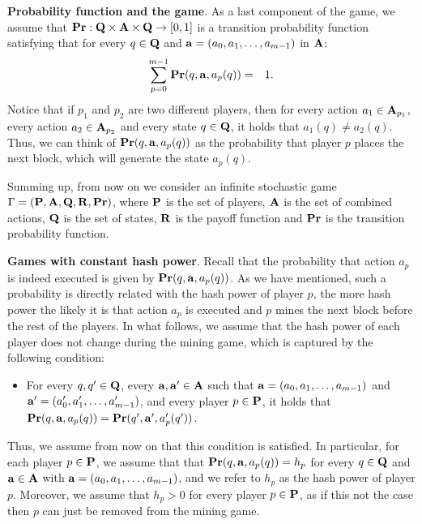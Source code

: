 \medskip
\noindent
\textbf{Probability function and the game}.
As a last component of the game, we assume that $\mathbf{Pr} : \mathbf{Q} \times \mathbf{A} \times \mathbf{Q} \to [0,1]$ is a transition probability function satisfying that for every $q \in \mathbf{Q}$ and $\mathbf{a} = (a_0, a_1, \ldots, a_{m-1})$ in $\mathbf{A}$:
\begin{eqnarray*}\label{eq-prop}
\sum_{p=0}^{m-1} \mathbf{Pr}(q, \mathbf{a}, a_p(q)) & = & 1.
\end{eqnarray*}
Notice that if $p_1$ and $p_2$ are two different players, then for every action $a_1 \in \mathbf{A}_{p_1}$, every action $a_2 \in \mathbf{A}_{p_2}$ and every state $q \in \mathbf{Q}$, it holds that $a_1(q) \neq a_2(q)$. Thus, we can think of $\mathbf{Pr}(q, \mathbf{a}, a_p(q))$ as the probability that player $p$ places the next block, which will generate the state $a_p(q)$. 

Summing up, from now on we consider an infinite stochastic game $\Gamma = (\mathbf{P},\mathbf{A},\mathbf{Q},\mathbf{R},\mathbf{Pr})$, where $\mathbf{P}$ is the set of players, $\mathbf{A}$ is the set of combined actions, $\mathbf{Q}$ is the set of states, $\mathbf{R}$ is the payoff function and $\mathbf{Pr}$ is the transition probability function.

\medskip
\noindent
\textbf{Games with constant hash power}.
Recall that the probability that action $a_p$ is indeed executed is given by $\mathbf{Pr}(q, \mathbf{a}, a_p(q))$. As we have mentioned, such a probability is directly related with the hash power of player $p$, the more hash power the likely it is that action $a_p$ is executed and $p$ mines the next block before the rest of the players. In what follows, we assume that the hash power of each player does not change during the mining game, which is captured by the following condition:
\begin{itemize}
\item For every $q, q' \in \mathbf{Q}$, every $\mathbf{a}, \mathbf{a}' \in \mathbf{A}$ such that $\mathbf{a} = (a_0, a_1, \ldots, a_{m-1})$ and $\mathbf{a}' = (a'_0, a'_1, \ldots, a'_{m-1})$,  and every player $p \in \mathbf{P}$, it holds that $\mathbf{Pr}(q, \mathbf{a}, a_p(q)) = \mathbf{Pr}(q', \mathbf{a}', a'_p(q'))$.
\end{itemize}
Thus, we assume from now on that this condition is satisfied. In particular, for each player $p \in \mathbf{P}$, we assume that that 
$\mathbf{Pr}(q, \mathbf{a}, a_p(q)) = h_p$ for every $q \in \mathbf{Q}$ and $\mathbf{a} \in \mathbf{A}$ with $\mathbf{a} = (a_0, a_1, \ldots, a_{m-1})$, and we refer to $h_p$ as the hash power of player $p$. 
Moreover, we assume that $h_p > 0$ for every player $p \in \mathbf{P}$, as if this not the case then $p$ can just be removed from the mining game. 

